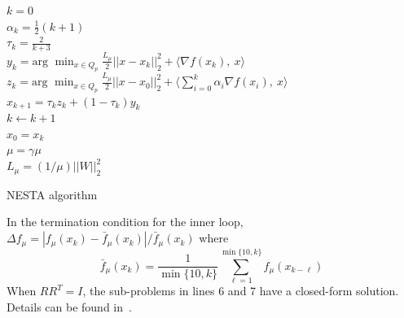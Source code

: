 \documentclass[twocolumn,oneside]{IEEEtran/IEEEtran}
\begin{document}
\begin{algorithm}
   
		
   {
    $k=0$\\
       {
        $\alpha_k = \frac{1}{2}(k+1)$ \\
        $\tau_k = \frac{2}{k+3}$ \\
        $\displaystyle y_k = \text{arg } \min_{x\in Q_p}
          \frac{L_{\mu}}{2}||x - x_k||_2^2 + \langle \nabla f(x_k),~ x\rangle$\\
        $\displaystyle {z_k = \text{arg } \min_{x\in Q_p} \frac{L_{\mu}}{2}||x-x_0||_2^2 +
        \langle \sum_{i=0}^k \alpha_i \nabla f(x_i), ~x \rangle}$\\
        $x_{k+1} = \tau_kz_k + (1-\tau_k)y_k$\\
        $k \leftarrow k + 1$\\
      }
      $x_0 = x_k$\\
      $\mu = \gamma \mu$\\
      $L_{\mu} = (1/\mu)||W||^2_2$
    }
  \caption{NESTA algorithm}
  \label{ag:NESTA}
\end{algorithm}


In the termination condition for the inner loop, $\Delta f_{\mu} = |f_{\mu}(x_k) - \bar{f}_{\mu}(x_k)|/\bar{f}_{\mu}(x_k)$ where
\begin{equation}
\bar{f}_{\mu}(x_k) = \frac{1}{\min\{10, k\}} \sum_{\ell=1}^{\min\{10,k\}} f_{\mu}(x_{k-\ell})
\end{equation}
When $RR^T=I$, the sub-problems in lines 6 and 7 have a closed-form solution. Details can be found in~\cite{becker_nesta_2011}.

\end{document}
